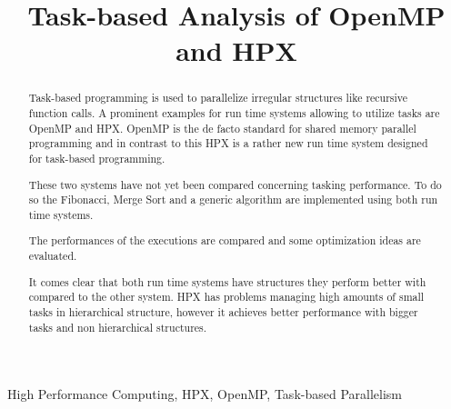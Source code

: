 \documentclass[conference]{IEEEtran}
\begin{document}
\title{Task-based Analysis of OpenMP and HPX}

\author{
}

\maketitle

\begin{abstract}
Task-based programming is used to parallelize irregular structures like recursive function calls.
A prominent examples for run time systems allowing to utilize tasks are OpenMP and HPX.
OpenMP is the de facto standard for shared memory parallel programming and in contrast to this HPX is a rather new run time system designed for task-based programming.

These two systems have not yet been compared concerning tasking performance.
To do so the Fibonacci, Merge Sort and a generic algorithm are implemented using both run time systems.

The performances of the executions are compared and some optimization ideas are evaluated.

It comes clear that both run time systems have structures they perform better with compared to the other system.
HPX has problems managing high amounts of small tasks in hierarchical structure, however it achieves better performance with bigger tasks and non hierarchical structures.
\end{abstract}

\begin{IEEEkeywords}
High Performance Computing, HPX, OpenMP, Task-based Parallelism
\end{IEEEkeywords}


















{}
\end{document}
